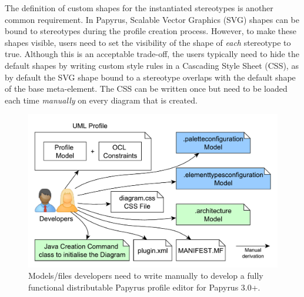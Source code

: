 The definition of custom shapes for the instantiated stereotypes is another common requirement. 
In Papyrus, Scalable Vector Graphics (SVG) shapes can be bound to stereotypes during the profile creation process. 
However, to make these shapes visible, users need to set the visibility of the shape of \textit{each} stereotype to true. 
Although this is an acceptable trade-off, the users typically need to hide the default shapes by writing custom style rules in a Cascading Style Sheet (CSS), as by default the SVG shape bound to a stereotype overlaps with the default shape of the base meta-element.
The CSS can be written once but need to be loaded each time \textit{manually} on every diagram that is created. 

\begin{figure}[ht!]
	\centering
	\includegraphics[width=1\textwidth]{diagrams/neededPapyrusFiles_new.pdf}
	\vspace{-3mm}
	\caption[]{Models/files developers need to write manually to 
		develop a fully functional distributable Papyrus profile editor for Papyrus 3.0+.}
	\label{fig:neededPapyrusFiles_new}

\end{figure}

